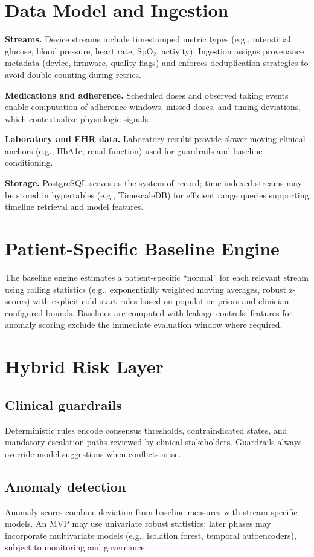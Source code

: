 \documentclass[conference]{IEEEtran}
\begin{document}
\section{Data Model and Ingestion}
\textbf{Streams.} Device streams include timestamped metric types (e.g., interstitial glucose, blood pressure, heart rate, SpO$_2$, activity). Ingestion assigns provenance metadata (device, firmware, quality flags) and enforces deduplication strategies to avoid double counting during retries.

\textbf{Medications and adherence.} Scheduled doses and observed taking events enable computation of adherence windows, missed doses, and timing deviations, which contextualize physiologic signals.

\textbf{Laboratory and EHR data.} Laboratory results provide slower-moving clinical anchors (e.g., HbA1c, renal function) used for guardrails and baseline conditioning.

\textbf{Storage.} PostgreSQL serves as the system of record; time-indexed streams may be stored in hypertables (e.g., TimescaleDB) for efficient range queries supporting timeline retrieval and model features.

\section{Patient-Specific Baseline Engine}
The baseline engine estimates a patient-specific ``normal'' for each relevant stream using rolling statistics (e.g., exponentially weighted moving averages, robust z-scores) with explicit cold-start rules based on population priors and clinician-configured bounds. Baselines are computed with leakage controls: features for anomaly scoring exclude the immediate evaluation window where required.

\section{Hybrid Risk Layer}
\subsection{Clinical guardrails}
Deterministic rules encode consensus thresholds, contraindicated states, and mandatory escalation paths reviewed by clinical stakeholders. Guardrails always override model suggestions when conflicts arise.

\subsection{Anomaly detection}
Anomaly scores combine deviation-from-baseline measures with stream-specific models. An MVP may use univariate robust statistics; later phases may incorporate multivariate models (e.g., isolation forest, temporal autoencoders), subject to monitoring and governance.
\end{document}
